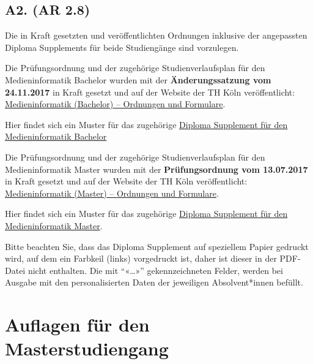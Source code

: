 \subsection{A2. (AR 2.8)
\label{/mi-2017/selbstbericht/auflagen/0000-auflagen}}\label{a2.-ar-2.8-pathlabelmi-2017selbstberichtauflagen0000-auflagen}

\begin{siderules}
Die in Kraft gesetzten und veröffentlichten Ordnungen inklusive der
angepassten Diploma Supplements für beide Studiengänge sind vorzulegen.
\end{siderules}

Die Prüfungsordnung und der zugehörige Studienverlaufsplan für den
Medieninformatik Bachelor wurden mit der \textbf{Änderungssatzung vom
24.11.2017} in Kraft gesetzt und auf der Website der TH Köln
veröffentlicht:
\href{https://www.th-koeln.de/studium/medieninformatik-bachelor--ordnungen-und-formulare_3963.php}{Medieninformatik
(Bachelor) -- Ordnungen und Formulare}.

Hier findet sich ein Muster für das zugehörige
\href{https://th-koeln.github.io/mi-2017/download/auflagen/THK-DS-MIF-MIB-PO4.pdf}{Diploma
Supplement für den Medieninformatik Bachelor}

Die Prüfungsordnung und der zugehörige Studienverlaufsplan für den
Medieninformatik Master wurden mit der \textbf{Prüfungsordnung vom
13.07.2017} in Kraft gesetzt und auf der Website der TH Köln
veröffentlicht:
\href{https://www.th-koeln.de/studium/medieninformatik-master--ordnungen-und-formulare_3724.php}{Medieninformatik
(Master) -- Ordnungen und Formulare}.

Hier findet sich ein Muster für das zugehörige
\href{https://th-koeln.github.io/mi-2017/download/auflagen/THK-DS-MIF-MIM-PO4.pdf}{Diploma
Supplement für den Medieninformatik Master}.

Bitte beachten Sie, dass das Diploma Supplement auf speziellem Papier
gedruckt wird, auf dem ein Farbkeil (links) vorgedruckt ist, daher ist
dieser in der PDF-Datei nicht enthalten. Die mit ``«\ldots{}»''
gekennzeichneten Felder, werden bei Ausgabe mit den personalisierten
Daten der jeweiligen Absolvent*innen befüllt.

\section{Auflagen für den
Masterstudiengang\label{/mi-2017/selbstbericht/auflagen/0000-auflagen}}\label{auflagen-fuxfcr-den-masterstudiengangpathlabelmi-2017selbstberichtauflagen0000-auflagen}

